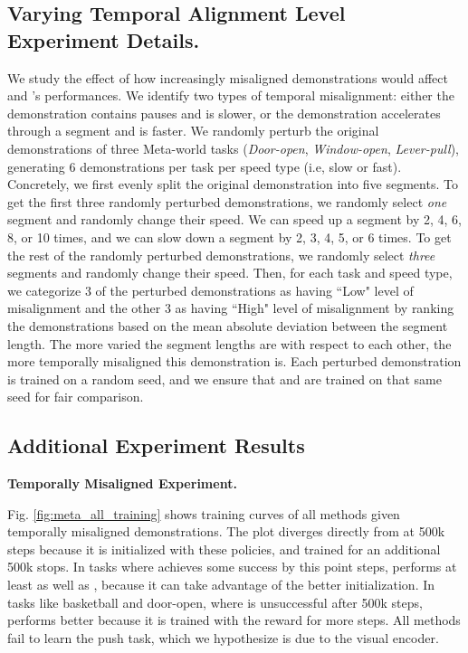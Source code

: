 \subsection{Varying Temporal Alignment Level Experiment Details.\label{app:random_mismatch_setup}}
We study the effect of how increasingly misaligned demonstrations would affect \orca{} and \tot{}'s performances.
We identify two types of temporal misalignment: either the demonstration contains pauses and is slower, or the demonstration accelerates through a segment and is faster.
We randomly perturb the original demonstrations of three Meta-world tasks (\textit{Door-open}, \textit{Window-open}, \textit{Lever-pull}), generating 6 demonstrations per task per speed type (i.e, slow or fast).
Concretely, we first evenly split the original demonstration into five segments.
To get the first three randomly perturbed demonstrations, we randomly select \emph{one} segment and randomly change their speed.
We can speed up a segment by 2, 4, 6, 8, or 10 times, and we can slow down a segment by 2, 3, 4, 5, or 6 times. 
To get the rest of the randomly perturbed demonstrations, we randomly select \emph{three} segments and randomly change their speed.
Then, for each task and speed type, we categorize 3 of the perturbed demonstrations as having ``Low" level of misalignment and the other 3 as having ``High" level of misalignment by ranking the demonstrations based on the mean absolute deviation between the segment length.
The more varied the segment lengths are with respect to each other, the more temporally misaligned this demonstration is. 
Each perturbed demonstration is trained on a random seed, and we ensure that \orca{} and \tot{} are trained on that same seed for fair comparison. 





\subsection{Additional Experiment Results}
\label{app:additional_experiments}
\textbf{Temporally Misaligned Experiment.}


Fig. \ref{fig:meta_all_training} shows training curves of all methods given temporally misaligned demonstrations. The \orca{} plot diverges directly from \tot{} at 500k steps because it is initialized with these \tot{} policies, and trained for an additional 500k stops. In tasks where \tot{} achieves some success by this point steps, \orca{} performs at least as well as \orcanp{}, because it can take advantage of the better initialization. In tasks like basketball and door-open, where \tot{} is unsuccessful after 500k steps, \orcanp{} performs better because it is trained with the \orca{} reward for more steps. All methods fail to learn the push task, which we hypothesize is due to the visual encoder.

